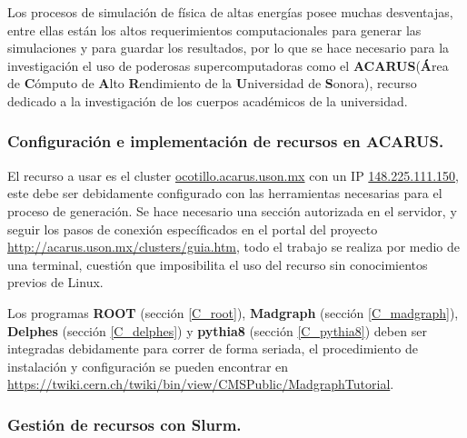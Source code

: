 Los procesos de simulación de física de altas energías posee muchas desventajas, entre ellas están los altos requerimientos computacionales para generar las simulaciones y para guardar los resultados, por lo que se hace necesario para la investigación el uso de poderosas supercomputadoras como el \textbf{ACARUS}(\textbf{Á}rea de \textbf{C}ómputo de \textbf{A}lto \textbf{R}endimiento de la \textbf{U}niversidad de \textbf{S}onora), recurso dedicado a la investigación de los cuerpos académicos de la universidad.

\subsubsection{Configuración e implementación de recursos en ACARUS.}
El recurso a usar es el cluster \url{ocotillo.acarus.uson.mx} con un IP \url{148.225.111.150}, este debe ser debidamente configurado con las herramientas necesarias para el proceso de generación. Se hace necesario una sección autorizada en el servidor, y seguir los pasos de conexión específicados en el portal del proyecto \url{http://acarus.uson.mx/clusters/guia.htm}, todo el trabajo se realiza por medio de una terminal, cuestión que imposibilita el uso del recurso sin conocimientos previos de Linux.

Los programas \textbf{ROOT} (sección \ref{C_root}), \textbf{Madgraph} (sección \ref{C_madgraph}), \textbf{Delphes} (sección \ref{C_delphes}) y \textbf{pythia8} (sección \ref{C_pythia8}) deben ser integradas debidamente para correr de forma seriada, el procedimiento de instalación y configuración se pueden encontrar en \url{https://twiki.cern.ch/twiki/bin/view/CMSPublic/MadgraphTutorial}. 

\subsubsection{Gestión de recursos con Slurm.}

